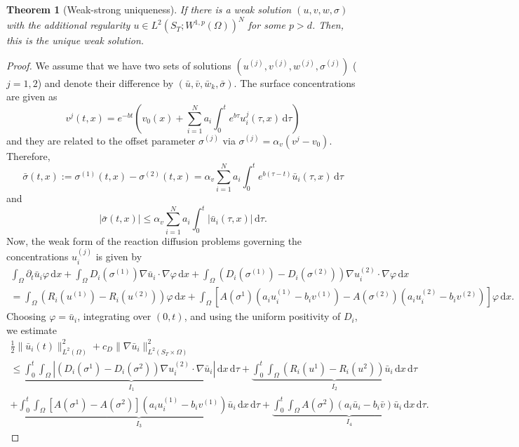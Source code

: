 \documentclass[reqno, 11pt]{amsart}
\newtheorem{thm}{Theorem}[section]
\numberwithin{equation}{section}
\newcommand{\di}[1]{\,\mathrm{d}#1}
\begin{document}
\begin{thm}[Weak-strong uniqueness]\label{thm.uniqueness}
    If there is a weak solution $(u,v,w,\sigma)$ with the additional regularity $u\in L^2(S_T;W^{1,p}(\Omega))^N$ for some $p>d$.
    Then, this is the unique weak solution.
\end{thm}
\begin{proof}
We assume that we have two sets of solutions $(u^{(j)},v^{(j)},w^{(j)},\sigma^{(j)})$ ($j=1,2$) and denote their difference by $(\bar{u},\bar{v},\bar{w}_k,\bar{\sigma})$.
The surface concentrations are given as
%
\[
v^j(t,x)=e^{-bt}\left(v_0(x)+\sum_{i=1}^Na_i\int_0^te^{b\tau}u_i^j(\tau,x)\di{\tau}\right)
\]
and they are related to the offset parameter $\sigma^{(j)}$ via $\sigma^{(j)}=\alpha_v (v^j-v_0)$.
Therefore, 
\[
\bar{\sigma}(t,x):=\sigma^{(1)}(t,x)-\sigma^{(2)}(t,x)=\alpha_v\sum_{i=1}^N a_i\int_0^te^{b(\tau-t)}\bar{u}_i(\tau,x)\di{\tau}
\]
and
%
\begin{equation}\label{eq:bar_sigma_estimate}
|\bar{\sigma}(t,x)|\leq\alpha_v\sum_{i=1}^N a_i\int_0^t|\bar{u}_i(\tau,x)|\di{\tau}.
\end{equation}
%
Now, the weak form of the reaction diffusion problems governing the concentrations $u_i^{(j)}$ is given by
%
\begin{multline*}
\int_\Omega\partial_t\bar{u}_i\varphi\di{x}+\int_\Omega D_i(\sigma^{(1)})\nabla\bar{u}_i\cdot\nabla\varphi\di{x}
+\int_\Omega\left(D_i(\sigma^{(1)})-D_i(\sigma^{(2)})\right)\nabla u_i^{(2)}\cdot\nabla\varphi\di{x}\\
=\int_\Omega (R_i(u^{(1)})-R_i(u^{(2)}))\varphi\di{x}
+\int_\Omega\left[A(\sigma^1)(a_iu_i^{(1)}- b_iv^{(1)})-A(\sigma^{(2)})(a_iu_i^{(2)}- b_iv^{(2)})\right]\varphi\di{x}.
\end{multline*}
%
Choosing $\varphi=\bar{u}_i$, integrating over $(0,t)$, and using the uniform positivity of $D_i$, we estimate
%
\begin{multline}\label{eq:initial_estimate}
\frac{1}{2}\|\bar{u}_i(t)\|_{L^2(\Omega)}^2+c_D\|\nabla\bar{u}_i\|_{L^2(S_T\times\Omega)}^2\\
\leq\underbrace{\int_0^t\int_\Omega\left|\left(D_i(\sigma^1)-D_i(\sigma^2)\right)\nabla u_i^{(2)}\cdot\nabla\bar{u}_i\right|\di{x}\di{\tau}}_{I_1}
+\underbrace{\int_0^t\int_\Omega (R_i(u^1)-R_i(u^2))\bar{u}_i\di{x}\di{\tau}}_{I_2}\\
+\underbrace{\int_0^t\int_\Omega\left[A(\sigma^1)-A(\sigma^2)\right](a_iu_i^{(1)}- b_iv^{(1)})\bar{u}_i\di{x}\di{\tau}}_{I_3}
+\underbrace{\int_0^t\int_\Omega A(\sigma^2)(a_i\bar{u}_i- b_i\bar{v})\bar{u}_i\di{x}\di{\tau}}_{I_4}.

\end{multline}
\end{proof}
\end{document}
